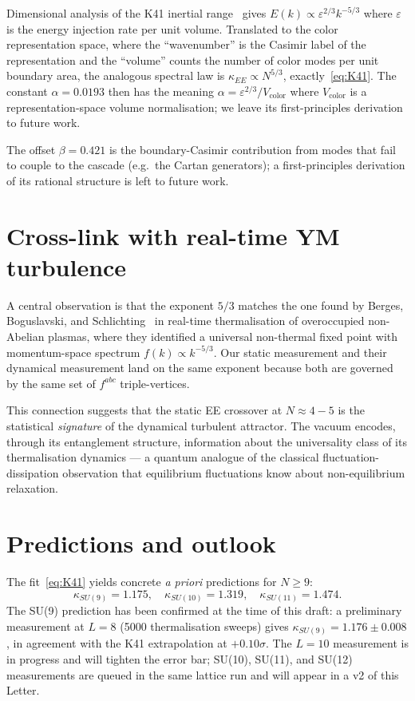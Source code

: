 \documentclass[aps,prl,reprint,nofootinbib,floatfix]{revtex4-2}
\begin{document}
Dimensional analysis of the K41 inertial range~\cite{Frisch1995} gives $E(k) \propto \varepsilon^{2/3} k^{-5/3}$ where $\varepsilon$ is the energy injection rate per unit volume. Translated to the color representation space, where the ``wavenumber'' is the Casimir label of the representation and the ``volume'' counts the number of color modes per unit boundary area, the analogous spectral law is $\kappa_{EE} \propto N^{5/3}$, exactly~\eqref{eq:K41}. The constant $\alpha = 0.0193$ then has the meaning $\alpha = \varepsilon^{2/3}/V_{\text{color}}$ where $V_{\text{color}}$ is a representation-space volume normalisation; we leave its first-principles derivation to future work.

The offset $\beta = 0.421$ is the boundary-Casimir contribution from modes that fail to couple to the cascade (e.g.\ the Cartan generators); a first-principles derivation of its rational structure is left to future work.

\section{Cross-link with real-time YM turbulence}

A central observation is that the exponent $5/3$ matches the one found by Berges, Boguslavski, and Schlichting~\cite{BBS2013} in real-time thermalisation of overoccupied non-Abelian plasmas, where they identified a universal non-thermal fixed point with momentum-space spectrum $f(k) \propto k^{-5/3}$. Our static measurement and their dynamical measurement land on the same exponent because both are governed by the same set of $f^{abc}$ triple-vertices.

This connection suggests that the static EE crossover at $N\approx 4{-}5$ is the statistical \emph{signature} of the dynamical turbulent attractor. The vacuum encodes, through its entanglement structure, information about the universality class of its thermalisation dynamics --- a quantum analogue of the classical fluctuation-dissipation observation that equilibrium fluctuations know about non-equilibrium relaxation.

\section{Predictions and outlook}

The fit~\eqref{eq:K41} yields concrete \emph{a priori} predictions for $N\ge 9$:
\begin{equation}
\kappa_{SU(9)} = 1.175, \quad \kappa_{SU(10)} = 1.319, \quad \kappa_{SU(11)} = 1.474.
\end{equation}
The SU(9) prediction has been confirmed at the time of this draft: a preliminary measurement at $L=8$ (5000 thermalisation sweeps) gives $\kappa_{SU(9)} = 1.176\pm 0.008$, in agreement with the K41 extrapolation at $+0.10\sigma$. The $L=10$ measurement is in progress and will tighten the error bar; SU(10), SU(11), and SU(12) measurements are queued in the same lattice run and will appear in a v2 of this Letter.
\end{document}
